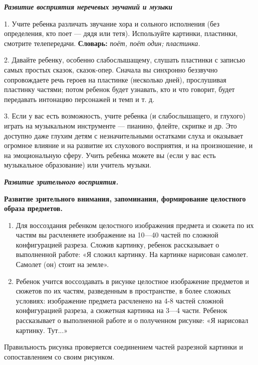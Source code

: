 \documentclass[a5paper]{book}
\renewcommand{\emph}[1]{\textit{#1}}
\begin{document}
\emph{\textbf{Развитие восприятия неречевых звучаний и музыки}}

1. Учите ребенка различать звучание хора и сольного исполнения (без
определения, кто поет --- дядя или тетя). Используйте картинки,
пластинки, смотрите телепередачи. \textbf{Словарь:} \emph{поёт, поёт
один; пластинка.}

2. Давайте ребенку, особенно слабослышащему, слушать пластинки с записью
самых простых сказок, сказок-опер. Сначала вы синхронно беззвучно
сопровождаете речь героев на пластинке (несколько дней), прослушивая
пластинку частями; потом ребенок будет узнавать, кто и что говорит,
будет передавать интонацию персонажей и темп и т. д.

3. Если у вас есть возможность, учите ребенка (и слабослышащего, и
глухого) играть на музыкальном инструменте --- пианино, флейте, скрипке
и др. Это доступно даже глухим детям с незначительными остатками слуха и
оказывает огромное влияние и на развитие их слухового восприятия, и на
произношение, и на эмоциональную сферу. Учить ребенка можете вы (если у
вас есть музыкальное образование) или учитель музыки.

\emph{\textbf{Развитие зрительного восприятия.}}

\textbf{Развитие зрительного внимания, запоминания, формирование
целостного образа предметов.}


\begin{enumerate}
\def\labelenumi{\arabic{enumi}.}
\item
  
  Для воссоздания ребенком целостного изображения предмета и сюжета по
  их частям вы расчленяете изображение на 10---40 частей по сложной
  конфигурацией разреза. Сложив картинку, ребенок рассказывает о
  выполненной работе: «Я сложил картинку. На картинке нарисован самолет.
  Самолет (он) стоит на земле».
  
\item
  
  Ребенок учится воссоздавать в рисунке целостное изображение предметов
  и сюжетов по их частям, разведенным в пространстве, в более сложных
  условиях: изображение предмета расчленено на 4-8 частей сложной
  конфигурацией разреза, а сюжетная картинка на 3---4 части. Ребенок
  рассказывает о выполненной работе и о полученном рисунке: «Я нарисовал
  картинку. Тут...»
  
\end{enumerate}


Правильность рисунка проверяется соединением частей разрезной картинки и
сопоставлением со своим рисунком.
\end{document}
